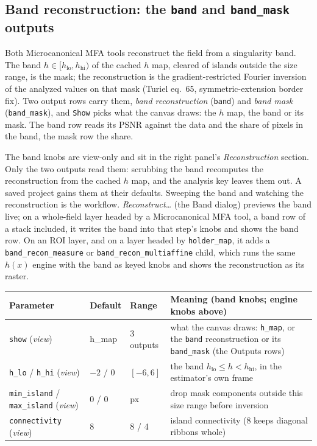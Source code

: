 \documentclass[10pt]{article}
\newcommand{\dev}[1]{\texttt{#1}}
\begin{document}
\subsection{Band reconstruction: the \texttt{band} and \texttt{band\_mask} outputs}\label{sec:band}
Both Microcanonical MFA tools reconstruct the field from a singularity band. The band
$h\in[h_{\text{lo}},h_{\text{hi}})$ of the cached $h$ map, cleared of islands outside the size
range, is the mask; the reconstruction is the gradient-restricted Fourier inversion of the
analyzed values on that mask (Turiel eq.~65, symmetric-extension border fix). Two output rows
carry them, \emph{band reconstruction} (\texttt{band}) and \emph{band mask}
(\texttt{band\_mask}), and \texttt{Show} picks what the canvas draws: the $h$ map, the band or
its mask. The band row reads its PSNR against the data and the share of pixels in the band, the
mask row the share.

The band knobs are view-only and sit in the right panel's \emph{Reconstruction} section. Only
the two outputs read them: scrubbing the band recomputes the reconstruction from the cached $h$
map, and the analysis key leaves them out. A saved project gains them at their defaults.
Sweeping the band and watching the reconstruction is the workflow. \emph{Reconstruct\ldots}
(the Band dialog) previews the band live; on a whole-field layer headed by a Microcanonical MFA
tool, a band row of a stack included, it writes the band into that step's knobs and shows the
band row. On an ROI layer, and on a layer headed by \dev{holder\_map}, it adds a
\dev{band\_recon\_measure} or \dev{band\_recon\_multiaffine} child, which runs the same $h(x)$
engine with the band as keyed knobs and shows the reconstruction as its raster.

\begin{longtable}{L l l M}
\toprule Parameter & Default & Range & Meaning (band knobs; engine knobs above) \\ \midrule
\texttt{show} (\emph{view}) & h\_map & 3 outputs & what the canvas draws: \texttt{h\_map}, or the \texttt{band} reconstruction or its \texttt{band\_mask} (the Outputs rows) \\
\texttt{h\_lo} / \texttt{h\_hi} (\emph{view}) & $-2$ / $0$ & $[-6,6]$ & the band $h_{\text{lo}}\le h<h_{\text{hi}}$, in the estimator's own frame \\
\texttt{min\_island} / \texttt{max\_island} (\emph{view}) & 0 / 0 & px & drop mask components outside this size range before inversion \\
\texttt{connectivity} (\emph{view}) & 8 & 8 / 4 & island connectivity (8 keeps diagonal ribbons whole) \\
\bottomrule
\end{longtable}
\end{document}
